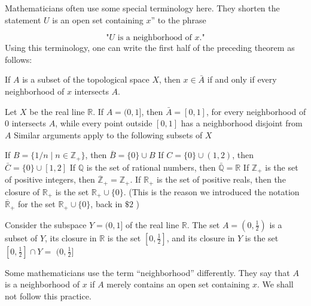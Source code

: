 Mathematicians often use some special terminology here. They shorten the statement \(U\) is an open set containing \(x\)'' to the phrase

\[
\text{"}U\text{ is a neighborhood of }x\text{."}
\]
Using this terminology, one can write the first half of the preceding theorem as follows:
\begin{centeredblock}
 If \(A\) is a subset of the topological space \(X\), then \(x \in \bar{A}\) if and only if every neighborhood of \(x\) intersects \(A\).
\end{centeredblock}

\begin{centeredblock}
\begin{example}
\label{ex:\thesection.\theexample}
 Let \(X\) be the real line \(\mathbb{R}\). If \(A = (0,1\rbrack\), then \(\bar{A} = [ {0,1}]\), for every neighborhood of 0 intersects \(A\), while every point outside \([ {0,1}]\) has a neighborhood disjoint from \(A\) Similar arguments apply to the following subsets of \(X\)

If \(B = \{ {1/n \mid n \in {\mathbb{Z}}_{ + }}\}\), then \(\bar{B} = \{ 0\} \cup B\) If \(C = \{ 0\} \cup ( {1,2})\), then \(\bar{C} = \{ 0\} \cup [ {1,2}]\) If \(\mathbb{Q}\) is the set of rational numbers, then \(\bar{\mathbb{Q}} = \mathbb{R}\) If \(\mathbb{Z}_{ + }\) is the set of positive integers, then \({\overline{\mathbb{Z}}}_{ + } = \mathbb{Z}_{ + }\). If \(\mathbb{R}_{ + }\) is the set of positive reals, then the closure of \(\mathbb{R}_{ + }\) is the set \(\mathbb{R}_{ + } \cup \{ 0\}\). (This is the reason we introduced the notation \({\overline{\mathbb{R}}}_{ + }\) for the set \(\mathbb{R}_{ + } \cup \{ 0\}\), back in \(\$ 2\) )
\end{example}
\end{centeredblock}

\begin{centeredblock}
\begin{example}
\label{ex:\thesection.\theexample}
 Consider the subspace \(Y = (0,1\rbrack\) of the real line \(\mathbb{R}\). The set \(A = ( {0,\frac{1}{2}})\) is a subset of \(Y\), its closure in \(\mathbb{R}\) is the set \([ {0,\frac{1}{2}}]\), and its closure in \(Y\) is the set \([ {0,\frac{1}{2}}] \cap Y =\) \(( {0,\frac{1}{2}}]\)
\end{example}
\end{centeredblock}

Some mathematicians use the term ``neighborhood'' differently. They say that \(A\) is a neighborhood of \(x\) if \(A\) merely contains an open set containing \(x\). We shall not follow this practice.

